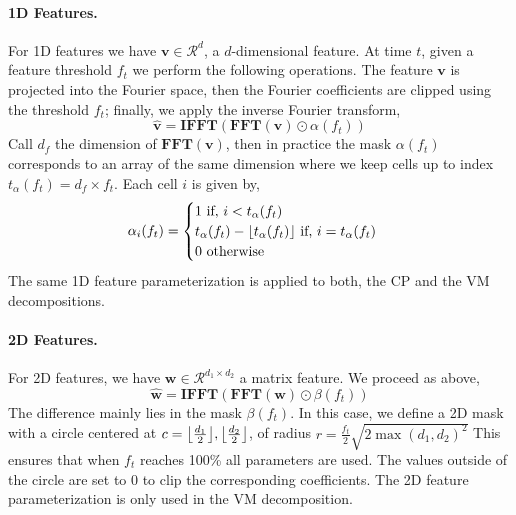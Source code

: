 \vspace{-1em}\paragraph{1D Features.}

For 1D features we have $\textbf{v} \in \mathcal{R}^d$, a $d$-dimensional feature. At time $t$, given a feature threshold $f_t$ we perform the following operations. The feature $\textbf{v}$ is projected into the Fourier space, then the Fourier coefficients are clipped using the threshold $f_t$; finally, we apply the inverse Fourier transform,
%
\begin{equation}
\hat{\textbf{v}} = \textbf{IFFT}(\textbf{FFT}(\textbf{v}) \odot \alpha(f_t))
\end{equation}
%
Call $d_f$ the dimension of $\textbf{FFT}(\textbf{v})$, then in practice the mask $\alpha(f_t)$ corresponds to an array of the same dimension where we keep cells up to index $t_\alpha(f_t) = d_f \times f_t$. Each cell $i$ is given by,
%
\begin{equation}
\alpha_i(f_t) = \begin{cases}
    1 \text{ if, } i <  t_\alpha(f_t)\\
    t_\alpha(f_t)- \floor*{t_\alpha(f_t)} \text{ if, } i = t_\alpha(f_t) \\
    0 \text{ otherwise} \\
\end{cases}
\end{equation}
%
The same 1D feature parameterization is applied to both, the CP and the VM decompositions.

\vspace{-1em}\paragraph{2D Features.}

For 2D features, we have $\textbf{w} \in \mathcal{R}^{d_1\times d_2}$ a matrix feature. We proceed as above,
%
\begin{equation}
\hat{\textbf{w}}= \textbf{IFFT}(\textbf{FFT}(\textbf{w}) \odot \beta(f_t))
\end{equation}
%
The difference mainly lies in the mask $\beta(f_t)$. In this case, we define a 2D mask with a circle centered at 
%
$c=\floor*{\frac{d_1}{2}},\floor*{\frac{d_2}{2}}$, of radius
$r=\frac{f_t}{2}\sqrt{2 \max(d_1,d_2)^2}$
%
This ensures that when $f_t$ reaches 100\% all parameters are used. The values outside of the circle are set to 0 to clip the corresponding coefficients. The 2D feature parameterization is only used in the VM decomposition.

